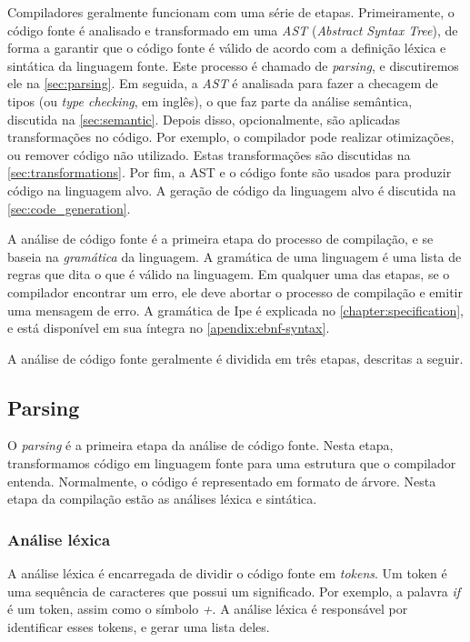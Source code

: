 Compiladores geralmente funcionam com uma série de etapas. Primeiramente, o
código fonte é analisado e transformado em uma \textit{AST}
(\textit{Abstract Syntax Tree}), de forma a garantir que o código fonte é válido de
acordo com a definição léxica e sintática da linguagem fonte. Este processo é
chamado de \textit{parsing}, e discutiremos ele na \autoref{sec:parsing}. Em seguida, a \textit{AST}
é analisada para fazer a checagem de tipos (ou \textit{type checking}, em inglês), o que faz parte
da análise semântica, discutida na \autoref{sec:semantic}. Depois disso,
opcionalmente, são aplicadas transformações no código. Por exemplo, o compilador pode realizar
otimizações, ou remover código não utilizado. Estas transformações são discutidas na
\autoref{sec:transformations}. Por fim, a AST e o código fonte são usados para produzir código na
linguagem alvo. A geração de código da linguagem alvo é discutida na \autoref{sec:code_generation}.
\cite{dragonbook}

A análise de código fonte é a primeira etapa do processo de compilação, e se
baseia na \textit{gramática} da linguagem. A gramática de uma linguagem é uma lista
de regras que dita o que é válido na linguagem. Em qualquer uma das etapas, se o
compilador encontrar um erro, ele deve abortar o processo de compilação e emitir
uma mensagem de erro. A gramática de Ipe é explicada no \autoref{chapter:specification},
e está disponível em sua íntegra no \autoref{apendix:ebnf-syntax}.

A análise de código fonte geralmente é dividida em três etapas, descritas a seguir.

\subsection{Parsing}\label{sec:parsing}

O \textit{parsing} é a primeira etapa da análise de código fonte. Nesta etapa,
transformamos código em linguagem fonte para uma estrutura que o compilador
entenda. Normalmente, o código é representado em formato de árvore. Nesta etapa
da compilação estão as análises léxica e sintática. \cite{dragonbook}

\subsubsection{Análise léxica}

A análise léxica é encarregada de dividir o código fonte em \textit{tokens}. Um
token é uma sequência de caracteres que possui um significado. Por exemplo, a
palavra \textit{if} é um token, assim como o símbolo \textit{+}. A análise léxica
é responsável por identificar esses tokens, e gerar uma lista deles.


